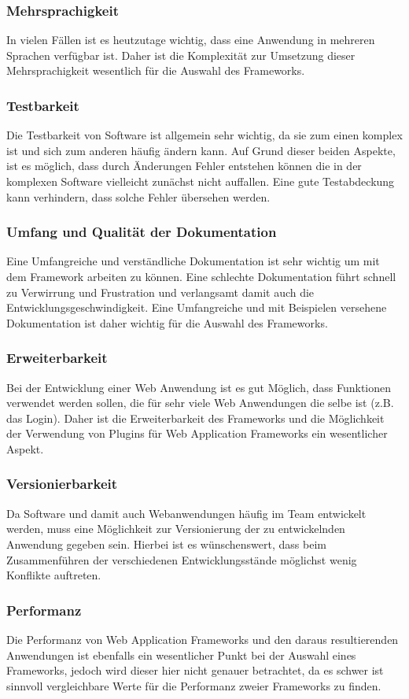 \subsubsection*{Mehrsprachigkeit}
In vielen Fällen ist es heutzutage wichtig, dass eine Anwendung in mehreren Sprachen verfügbar ist. Daher ist die Komplexität zur Umsetzung dieser Mehrsprachigkeit wesentlich für die Auswahl des Frameworks.
\subsubsection*{Testbarkeit}
Die Testbarkeit von Software ist allgemein sehr wichtig, da sie zum einen komplex ist und sich zum anderen häufig ändern kann. Auf Grund dieser beiden Aspekte, ist es möglich, dass durch Änderungen Fehler entstehen können die in der komplexen Software vielleicht zunächst nicht auffallen. Eine gute Testabdeckung kann verhindern, dass solche Fehler übersehen werden.
\subsubsection*{Umfang und Qualität der Dokumentation}
Eine Umfangreiche und verständliche Dokumentation ist sehr wichtig um mit dem Framework arbeiten zu können. Eine schlechte Dokumentation führt schnell zu Verwirrung und Frustration und verlangsamt damit auch die Entwicklungsgeschwindigkeit. Eine Umfangreiche und mit Beispielen versehene Dokumentation ist daher wichtig für die Auswahl des Frameworks.
\subsubsection*{Erweiterbarkeit}
Bei der Entwicklung einer Web Anwendung ist es gut Möglich, dass Funktionen verwendet werden sollen, die für sehr viele Web Anwendungen die selbe ist (z.B. das Login). Daher ist die Erweiterbarkeit des Frameworks und die Möglichkeit der Verwendung von Plugins für Web Application Frameworks ein wesentlicher Aspekt.
\subsubsection*{Versionierbarkeit}
Da Software und damit auch Webanwendungen häufig im Team entwickelt werden, muss eine Möglichkeit zur Versionierung der zu entwickelnden Anwendung gegeben sein. Hierbei ist es wünschenswert, dass beim Zusammenführen der verschiedenen Entwicklungsstände möglichst wenig Konflikte auftreten.
\subsubsection*{Performanz}
Die Performanz von Web Application Frameworks und den daraus resultierenden Anwendungen ist ebenfalls ein wesentlicher Punkt bei der Auswahl eines Frameworks, jedoch wird dieser hier nicht genauer betrachtet, da es schwer ist sinnvoll vergleichbare Werte für die Performanz zweier Frameworks zu finden.
